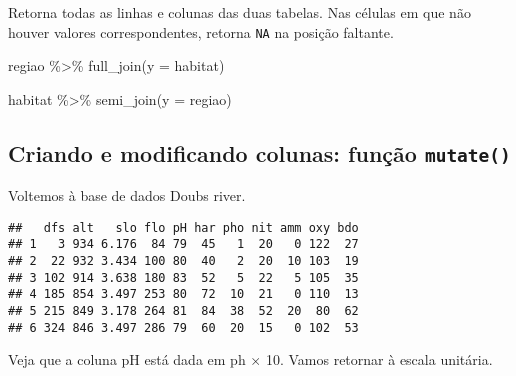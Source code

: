 \documentclass[
]{book}
\newenvironment{Shaded}{\begin{snugshade}}{\end{snugshade}}
\newcommand{\AttributeTok}[1]{\textcolor[rgb]{0.77,0.63,0.00}{#1}}
\newcommand{\FunctionTok}[1]{\textcolor[rgb]{0.00,0.00,0.00}{#1}}
\newcommand{\NormalTok}[1]{#1}
\newcommand{\OtherTok}[1]{\textcolor[rgb]{0.56,0.35,0.01}{#1}}
\newcommand{\SpecialCharTok}[1]{\textcolor[rgb]{0.00,0.00,0.00}{#1}}
\begin{document}
Retorna todas as linhas e colunas das duas tabelas. Nas células em que não houver valores correspondentes, retorna \texttt{NA} na posição faltante.

\begin{Shaded}
\begin{Highlighting}[]
\NormalTok{regiao }\SpecialCharTok{\%\textgreater{}\%} \FunctionTok{full\_join}\NormalTok{(}\AttributeTok{y =}\NormalTok{ habitat)}
\end{Highlighting}
\end{Shaded}

\begin{Shaded}
\begin{Highlighting}[]
\NormalTok{habitat }\SpecialCharTok{\%\textgreater{}\%} \FunctionTok{semi\_join}\NormalTok{(}\AttributeTok{y =}\NormalTok{ regiao)}
\end{Highlighting}
\end{Shaded}

\hypertarget{criando-e-modificando-colunas-funuxe7uxe3o-mutate}{%
\subsection{\texorpdfstring{Criando e modificando colunas: função \texttt{mutate()}}{Criando e modificando colunas: função mutate()}}\label{criando-e-modificando-colunas-funuxe7uxe3o-mutate}}

Voltemos à base de dados Doubs river.

\begin{Shaded}
\end{Shaded}

\begin{verbatim}
##   dfs alt   slo flo pH har pho nit amm oxy bdo
## 1   3 934 6.176  84 79  45   1  20   0 122  27
## 2  22 932 3.434 100 80  40   2  20  10 103  19
## 3 102 914 3.638 180 83  52   5  22   5 105  35
## 4 185 854 3.497 253 80  72  10  21   0 110  13
## 5 215 849 3.178 264 81  84  38  52  20  80  62
## 6 324 846 3.497 286 79  60  20  15   0 102  53
\end{verbatim}

Veja que a coluna pH está dada em ph \(\times\) 10. Vamos retornar à escala unitária.
\end{document}
